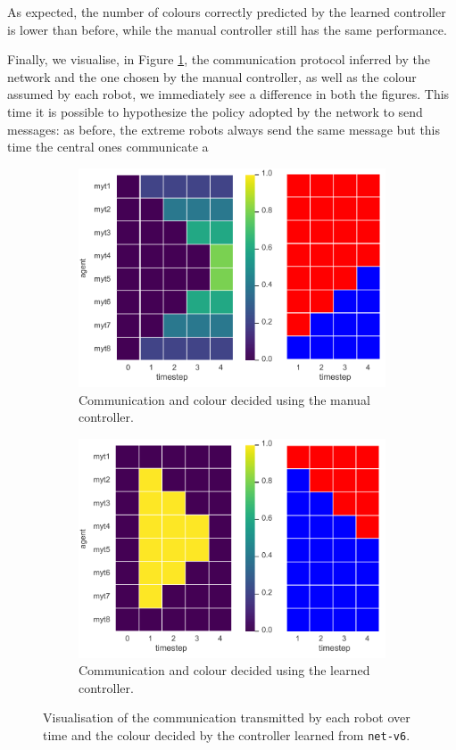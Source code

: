\noindent
As expected, the number of colours correctly predicted by the learned controller 
is lower than before, while the manual controller still has the same performance.  

Finally, we visualise, in Figure \ref{fig:net-v6commcolour}, the communication 
protocol inferred by the network and the one chosen by the manual controller, as 
well as the colour assumed by each robot, we immediately see a difference in both 
the figures.
This time it is possible to hypothesize the policy adopted by the network to send 
messages: as before, the extreme robots always send the same message but this 
time the central ones communicate a  
\begin{figure}[!htb]
	\begin{subfigure}[h]{\textwidth}
		\centering
		\includegraphics[width=.55\textwidth]{contents/images/net-v6/net-v6-manual-0}
		\caption{Communication and colour decided using the manual controller.}
	\end{subfigure}
	\hspace*{\fill}%
	\vspace*{8pt}%
	\hspace*{\fill}%
	\begin{subfigure}[h]{\textwidth}
		\centering			
		\includegraphics[width=.55\textwidth]{contents/images/net-v6/net-v6-learned-0}
		\caption{Communication and colour decided using the learned controller.}
	\end{subfigure}
	\caption[Evaluation of the communication learned by 
	\texttt{net-v6}.]{Visualisation of the communication transmitted by each 
		robot over time and the colour decided by the controller learned from 
		\texttt{net-v6}.}	
	\label{fig:net-v6commcolour}
\end{figure}

